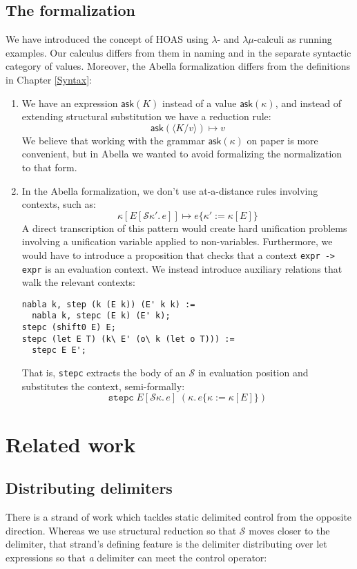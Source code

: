 \documentclass[a4paper, 11pt,titlepage, openright, twoside]{report}
\newcommand{\keyword}[1]{\textsf{\textup{#1}}}
\newcommand{\Ask}{\textsf{ask}}
\newcommand{\KwLet}{\keyword{let}}
\newcommand{\subst}[2]{\{#1{:=}#2\}}
\renewcommand{\S}{\mathcal{S}}
\newcommand{\+}{\enspace}
\begin{document}
\section{The formalization}
We have introduced the concept of HOAS using $λ$- and $λμ$-calculi as running examples.
Our calculus differs from them in naming and in the separate syntactic category of values.
Moreover, the Abella formalization differs from the definitions in Chapter \ref{Syntax}:
\begin{enumerate}
	\item
		We have an expression $\Ask(K)$ instead of a value $\Ask(κ)$,
		and instead of extending structural substitution we have a reduction rule:
		$$\Ask(⟨K/v⟩) ↦ v$$
		We believe that working with the grammar $\Ask(κ)$ on paper is more convenient,
		but in Abella we wanted to avoid formalizing the normalization to that form.
	\item
		In the Abella formalization, we don't use at-a-distance rules involving contexts, such as:
		$$κ[E[\S κ'.\,e]] ↦ e\subst{κ'}{κ[E]}$$
		A direct transcription of this pattern would create hard unification problems
		involving a unification variable applied to non-variables.
		Furthermore, we would have to introduce a proposition that checks
		that a context \lstinline{expr -> expr} is an evaluation context.
		We instead introduce auxiliary relations that walk the relevant contexts:
		\begin{lstlisting}
nabla k, step (k (E k)) (E' k k) :=
  nabla k, stepc (E k) (E' k);
stepc (shift0 E) E;
stepc (let E T) (k\ E' (o\ k (let o T))) :=
  stepc E E';
		\end{lstlisting}
		That is, \lstinline{stepc} extracts the body of an $\S$ in evaluation position and substitutes the context, semi-formally:
		$$\texttt{stepc}\;E[\S κ.\,e] \;(κ.\,e\subst{κ}{κ[E]})$$
\end{enumerate}

\chapter{Related work}


\section{Distributing delimiters}
There is a strand of work which tackles static delimited control from the opposite direction.
Whereas we use structural reduction so that $\S$ moves closer to the delimiter, that strand's defining feature is
the delimiter distributing over \KwLet{} expressions so that \textit{a} delimiter can meet the control operator:
\end{document}
